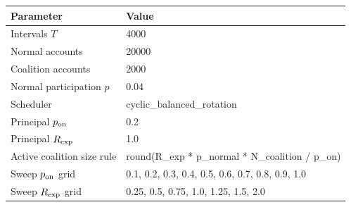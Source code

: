 \begin{tabular}{ll}
\toprule
Parameter & Value \\
\midrule
Intervals $T$ & 4000 \\
Normal accounts & 20000 \\
Coalition accounts & 2000 \\
Normal participation $p$ & 0.04 \\
Scheduler & cyclic_balanced_rotation \\
Principal $p_{\rm on}$ & 0.2 \\
Principal $R_{\rm exp}$ & 1.0 \\
Active coalition size rule & round(R_exp * p_normal * N_coalition / p_on) \\
Sweep $p_{\rm on}$ grid & 0.1, 0.2, 0.3, 0.4, 0.5, 0.6, 0.7, 0.8, 0.9, 1.0 \\
Sweep $R_{\rm exp}$ grid & 0.25, 0.5, 0.75, 1.0, 1.25, 1.5, 2.0 \\
\bottomrule
\end{tabular}
